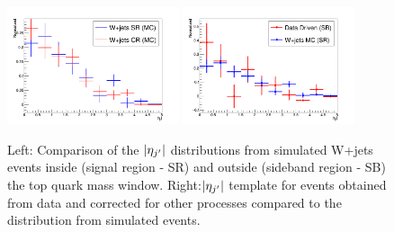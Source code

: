 \begin{figure}[!Hhtb]
\centering
\includegraphics[width=0.45\textwidth]{figures/WJetsTemplatesMC.png}
\includegraphics[width=0.45\textwidth]{figures/Selection_002.png}
\caption{Left: Comparison of the $|\eta_{j^\prime}|$ distributions from simulated W+jets events inside (signal region - SR) and outside (sideband region - SB) the top quark mass window. Right:$|\eta_{j^\prime}|$ template for \wjets events obtained from data and corrected for other processes compared to the distribution from simulated \wjets events. }
\label{fig:WjetsDDtemplate}
\end{figure}





 
       

